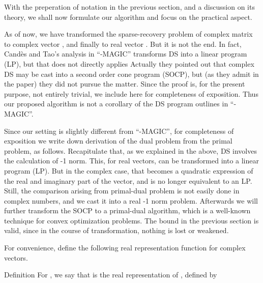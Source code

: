 \startchapter [title={Simulation}]

With the preperation of notation in the previous section, and a discussion on its theory, we shall now formulate our algorithm and focus on the practical aspect.

As of now, we have transformed the sparse-recovery problem of complex matrix  to complex vector , and finally to real vector .
But it is not the end.
In fact, Cand\`es and Tao's analysis in ``-MAGIC'' transforms DS into a linear program (LP), but that does not directly applies
Actually they pointed out that complex DS may be cast into a second order cone program (SOCP), but (as they admit in the paper) they did not pursue the matter.
Since the proof is, for the present purpose, not entirely trivial, we include here for completeness of exposition.
Thus our proposed algorithm is not a corollary of the DS program outlines in ``-MAGIC''.

\startsection [title={Transformation of the Problem}]

\startsubsection [title={Representation by Real Matrices}]

Since our setting is slightly different from ``-MAGIC'', for completeness of exposition we write down derivation of the dual problem from the primal problem, as follows.
Recapitulate that, as we explained in the above, DS involves the calculation of -1 norm.
This, for real vectors, can be transformed into a linear program (LP).
But in the complex case, that becomes a quadratic expression of the real and imaginary part of the vector, and is no longer equivalent to an LP.
Still, the comparison arising from primal-dual problem is not easily done in complex numbers, and we cast it into a real -1 norm problem.
Afterwards we will further transform the SOCP to a primal-dual algorithm, which is a well-known technique for convex optimization problems.
The bound in the previous section is valid, since in the course of transformation, nothing is lost or weakened.

For convenience, define the following real representation function for complex vectors.

\Result
{Definition}
{
For , we say that  is the real representation of , defined by
%
%
}

